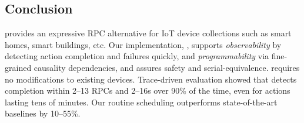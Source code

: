 \subsection{Conclusion}
\label{rasc:sec:conclusion}

\abs{} provides an expressive RPC alternative for IoT device collections such as smart homes, smart buildings, etc. Our implementation, \sysname, supports \textit{observability} by detecting action completion and failures quickly, and \textit{programmability} via fine-grained causality dependencies, and assures safety and serial-equivalence. \sysname{} requires no modifications to existing devices. 
Trace-driven evaluation showed that \sysname{} detects completion within 2--13 RPCs and 2--16s over 90\% of the time,
even for actions lasting tens of minutes.  Our
routine scheduling outperforms state-of-the-art baselines by 10--55\%.
